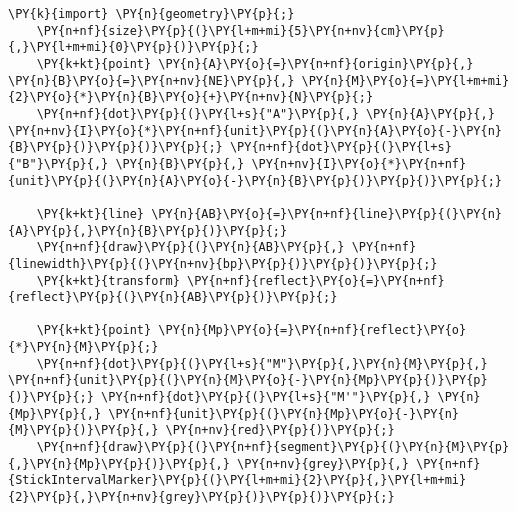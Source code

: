 \begin{Verbatim}[commandchars=\\\{\}]
    \PY{k}{import} \PY{n}{geometry}\PY{p}{;}
    \PY{n+nf}{size}\PY{p}{(}\PY{l+m+mi}{5}\PY{n+nv}{cm}\PY{p}{,}\PY{l+m+mi}{0}\PY{p}{)}\PY{p}{;}
    \PY{k+kt}{point} \PY{n}{A}\PY{o}{=}\PY{n+nf}{origin}\PY{p}{,} \PY{n}{B}\PY{o}{=}\PY{n+nv}{NE}\PY{p}{,} \PY{n}{M}\PY{o}{=}\PY{l+m+mi}{2}\PY{o}{*}\PY{n}{B}\PY{o}{+}\PY{n+nv}{N}\PY{p}{;}
    \PY{n+nf}{dot}\PY{p}{(}\PY{l+s}{"A"}\PY{p}{,} \PY{n}{A}\PY{p}{,} \PY{n+nv}{I}\PY{o}{*}\PY{n+nf}{unit}\PY{p}{(}\PY{n}{A}\PY{o}{-}\PY{n}{B}\PY{p}{)}\PY{p}{)}\PY{p}{;} \PY{n+nf}{dot}\PY{p}{(}\PY{l+s}{"B"}\PY{p}{,} \PY{n}{B}\PY{p}{,} \PY{n+nv}{I}\PY{o}{*}\PY{n+nf}{unit}\PY{p}{(}\PY{n}{A}\PY{o}{-}\PY{n}{B}\PY{p}{)}\PY{p}{)}\PY{p}{;}

    \PY{k+kt}{line} \PY{n}{AB}\PY{o}{=}\PY{n+nf}{line}\PY{p}{(}\PY{n}{A}\PY{p}{,}\PY{n}{B}\PY{p}{)}\PY{p}{;}
    \PY{n+nf}{draw}\PY{p}{(}\PY{n}{AB}\PY{p}{,} \PY{n+nf}{linewidth}\PY{p}{(}\PY{n+nv}{bp}\PY{p}{)}\PY{p}{)}\PY{p}{;}
    \PY{k+kt}{transform} \PY{n+nf}{reflect}\PY{o}{=}\PY{n+nf}{reflect}\PY{p}{(}\PY{n}{AB}\PY{p}{)}\PY{p}{;}

    \PY{k+kt}{point} \PY{n}{Mp}\PY{o}{=}\PY{n+nf}{reflect}\PY{o}{*}\PY{n}{M}\PY{p}{;}
    \PY{n+nf}{dot}\PY{p}{(}\PY{l+s}{"M"}\PY{p}{,}\PY{n}{M}\PY{p}{,} \PY{n+nf}{unit}\PY{p}{(}\PY{n}{M}\PY{o}{-}\PY{n}{Mp}\PY{p}{)}\PY{p}{)}\PY{p}{;} \PY{n+nf}{dot}\PY{p}{(}\PY{l+s}{"M'"}\PY{p}{,} \PY{n}{Mp}\PY{p}{,} \PY{n+nf}{unit}\PY{p}{(}\PY{n}{Mp}\PY{o}{-}\PY{n}{M}\PY{p}{)}\PY{p}{,} \PY{n+nv}{red}\PY{p}{)}\PY{p}{;}
    \PY{n+nf}{draw}\PY{p}{(}\PY{n+nf}{segment}\PY{p}{(}\PY{n}{M}\PY{p}{,}\PY{n}{Mp}\PY{p}{)}\PY{p}{,} \PY{n+nv}{grey}\PY{p}{,} \PY{n+nf}{StickIntervalMarker}\PY{p}{(}\PY{l+m+mi}{2}\PY{p}{,}\PY{l+m+mi}{2}\PY{p}{,}\PY{n+nv}{grey}\PY{p}{)}\PY{p}{)}\PY{p}{;}
\end{Verbatim}

